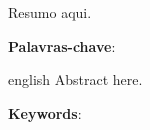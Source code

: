 \clearpage\mbox{}\clearpage

\begin{resumo}
    Resumo aqui.
    
    \vspace{\onelineskip}
    \noindent    
    \textbf{Palavras-chave}: \palavraschave
\end{resumo}

 \begin{resumo}[Abstract]
     \begin{otherlanguage*}{english}
         Abstract here.
     
         \vspace{\onelineskip}
         \noindent
         \textbf{Keywords}: \keywords
     \end{otherlanguage*}
 \end{resumo}


